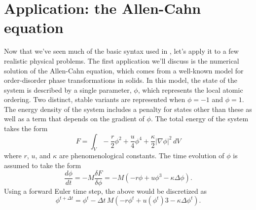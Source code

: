 \section{Application: the Allen-Cahn equation}
Now that we've seen much of the basic syntax used in \MMSP, let's apply it to a few realistic physical problems.  The first application we'll discuss is the numerical solution of the Allen-Cahn equation, which comes from a well-known model for order-disorder phase transformations in solids.  In this model, the state of the system is described by a single parameter, $\phi$, which represents the local atomic ordering.  Two distinct, stable variants are represented when $\phi=-1$ and $\phi=1$.  The energy density of the system includes a penalty for states other than these as well as a term that depends on the gradient of $\phi$.  The total energy of the system takes the form
\begin{equation}
F = \int_V -\frac{r}{2}\phi^2+\frac{u}{4}\phi^4+\frac{\kappa}{2}|\nabla \phi|^2\, dV
\end{equation}
where $r$, $u$, and $\kappa$ are phenomenological constants.  The time evolution of $\phi$ is assumed to take the form
\begin{equation}
\frac{d\phi}{dt} = -M\frac{\delta F}{\delta \phi} = -M(-r\phi+u\phi^3-\kappa\Delta \phi).
\end{equation}
Using a forward Euler time step, the above would be discretized as
\begin{equation}
\phi^{t+\Delta t} = \phi^t -\Delta t\, M(-r\phi^t+u(\phi^t)3-\kappa\Delta \phi^t).
\end{equation}

